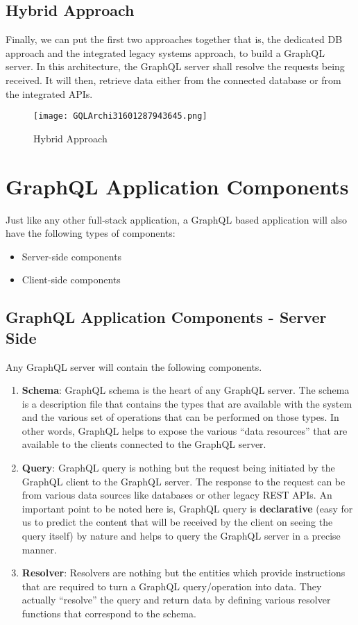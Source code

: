 \documentclass[../main.tex]{subfiles}
\begin{document}
\subsection{Hybrid Approach}
Finally, we can put the first two approaches together that is, the dedicated DB approach and the integrated legacy systems approach, to build a GraphQL server. In this architecture, the GraphQL server shall resolve the requests being received. It will then, retrieve data either from the connected database or from the integrated APIs.

\begin{figure}[h!]
\centerline{\texttt{[image: GQLArchi31601287943645.png]}}
\caption{Hybrid Approach}
\label{fig:Hybrid-Approach}
\end{figure}

\section{GraphQL Application Components}
Just like any other full-stack application, a GraphQL based application will also have the following types of components:
\begin{itemize}
  \item Server-side components
  \item Client-side components
\end{itemize}
\subsection{GraphQL Application Components - Server Side}
Any GraphQL server will contain the following components.

\begin{enumerate}
  \item { \textbf{Schema}: GraphQL schema is the heart of any GraphQL server. The schema is a description file that contains the types that are available with the system and the various set of operations that can be performed on those types. In other words, GraphQL helps to expose the various “data resources” that are available to the clients connected to the GraphQL server.}
  \item { \textbf{Query}: GraphQL query is nothing but the request being initiated by the GraphQL client to the GraphQL server. The response to the request can be from various data sources like databases or other legacy REST APIs. An important point to be noted here is, GraphQL query is \textbf{declarative} (easy for us to predict the content that will be received by the client on seeing the query itself) by nature and helps to query the GraphQL server in a precise manner.}
  \item { \textbf{Resolver}: Resolvers are nothing but the entities which provide instructions that are required to turn a GraphQL query/operation into data. They actually “resolve” the query and return data by defining various resolver functions that correspond to the schema.}
\end{enumerate}
\end{document}
